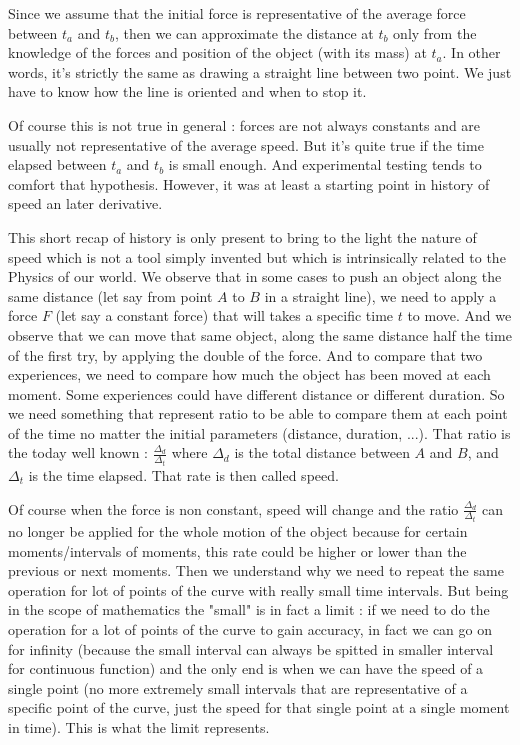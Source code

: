 \documentclass[12pt]{article}
\begin{document}
Since we assume that the initial force is representative of the average force between $t_a$ and $t_b$, then we can approximate the distance at $t_b$ only from the knowledge of the forces and position of the object (with its mass) at $t_a$.
In other words, it's strictly the same as drawing a straight line between two point. We just have to know how the line is oriented and when to stop it.

Of course this is not true in general : forces are not always constants and are usually not representative of the average speed. But it's quite true if the time elapsed between $t_a$ and $t_b$ is small enough. And experimental testing tends to comfort that hypothesis. However, it was at least a starting point in history of speed an later derivative.

This short recap of history is only present to bring to the light the nature of speed which is not a tool simply invented but which is intrinsically related to the Physics of our world. We observe that in some cases to push an object along the same distance (let say from point $A$ to $B$ in a straight line), we need to apply a force $F$ (let say a constant force) that will takes a specific time $t$ to move. And we observe that we can move that same object, along the same distance half the time of the first try, by applying the double of the force.
And to compare that two experiences, we need to compare how much the object has been moved at each moment. Some experiences could have different distance or different duration. So we need something that represent ratio to be able to compare them at each point of the time no matter the initial parameters (distance, duration, ...). That ratio is the today well known : $\frac{\Delta_d}{\Delta_t}$ where $\Delta_d$ is the total distance between $A$ and $B$, and $\Delta_t$ is the time elapsed. That rate is then called speed.

Of course when the force is non constant, speed will change and the ratio $\frac{\Delta_d}{\Delta_t}$ can no longer be applied for the whole motion of the object because for certain moments/intervals of moments, this rate could be higher or lower than the previous or next moments. Then we understand why we need to repeat the same operation for lot of points of the curve with really small time intervals. But being in the scope of mathematics the "small" is in fact a limit : if we need to do the operation for a lot of points of the curve to gain accuracy, in fact we can go on for infinity (because the small interval can always be spitted in smaller interval for continuous function) and the only end is when we can have the speed of a single point (no more extremely small intervals that are representative of a specific point of the curve, just the speed for that single point at a single moment in time). This is what the limit represents.
\end{document}
